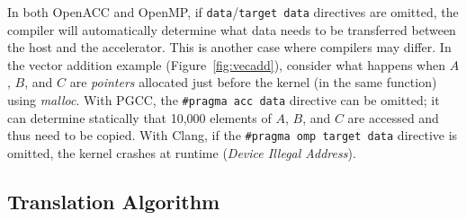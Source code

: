 \documentclass{sig-alternate-05-2015}
\begin{document}
In both OpenACC and OpenMP, if \texttt{data}/\texttt{target data} directives
are omitted, the compiler will automatically determine what data needs to be
transferred between the host and the accelerator.  This is another case where
compilers may differ.  In the vector addition example
(Figure~\ref{fig:vecadd}), consider what happens when $A$, $B$, and $C$ are
\emph{pointers} allocated just before the kernel (in the same function) using
\textit{malloc}.  With PGCC, the \texttt{\#pragma acc data} directive can be
omitted; it can determine statically that 10,000 elements of $A$, $B$, and
$C$ are accessed and thus need to be copied.  With Clang, if the
\texttt{\#pragma omp target data} directive is omitted, the kernel crashes at
runtime (\emph{Device Illegal Address}).

\subsection{Translation Algorithm}
\end{document}
